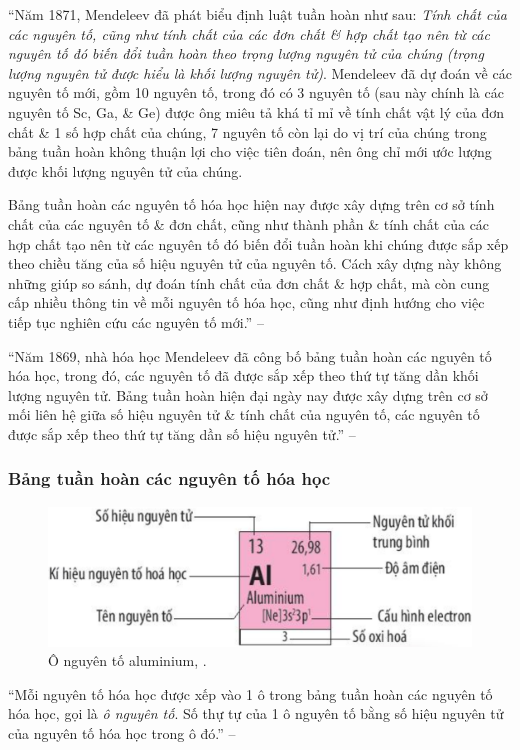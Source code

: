 \documentclass{article}
\numberwithin{equation}{section}
\begin{document}
``Năm 1871, Mendeleev đã phát biểu định luật tuần hoàn như sau: \textit{Tính chất của các nguyên tố, cũng như tính chất của các đơn chất \& hợp chất tạo nên từ các nguyên tố đó biến đổi tuần hoàn theo trọng lượng nguyên tử của chúng (trọng lượng nguyên tử được hiểu là khối lượng nguyên tử)}. Mendeleev đã dự đoán về các nguyên tố mới, gồm 10 nguyên tố, trong đó có 3 nguyên tố (sau này chính là các nguyên tố Sc, Ga, \& Ge) được ông miêu tả khá tỉ mỉ về tính chất vật lý của đơn chất \& 1 số hợp chất của chúng, 7 nguyên tố còn lại do vị trí của chúng trong bảng tuần hoàn không thuận lợi cho việc tiên đoán, nên ông chỉ mới ước lượng được khối lượng nguyên tử của chúng.

Bảng tuần hoàn các nguyên tố hóa học hiện nay được xây dựng trên cơ sở tính chất của các nguyên tố \& đơn chất, cũng như thành phần \& tính chất của các hợp chất tạo nên từ các nguyên tố đó biến đổi tuần hoàn khi chúng được sắp xếp theo chiều tăng của số hiệu nguyên tử của nguyên tố. Cách xây dựng này không những giúp so sánh, dự đoán tính chất của đơn chất \& hợp chất, mà còn cung cấp nhiều thông tin về mỗi nguyên tố hóa học, cũng như định hướng cho việc tiếp tục nghiên cứu các nguyên tố mới.'' -- \cite[p. 36]{SGK_Hoa_Hoc_10_Chan_Troi_Sang_Tao}

``Năm 1869, nhà hóa học Mendeleev đã công bố bảng tuần hoàn các nguyên tố hóa học, trong đó, các nguyên tố đã được sắp xếp theo thứ tự tăng dần khối lượng nguyên tử. Bảng tuần hoàn hiện đại ngày nay được xây dựng trên cơ sở mối liên hệ giữa số hiệu nguyên tử \& tính chất của nguyên tố, các nguyên tố được sắp xếp theo thứ tự tăng dần số hiệu nguyên tử.'' -- \cite[p. 38]{SGK_Hoa_Hoc_10_Chan_Troi_Sang_Tao}

\subsubsection{Bảng tuần hoàn các nguyên tố hóa học}

\begin{figure}[h]
	\centering
	\includegraphics[scale=0.15]{o_nguyen_to_aluminium}
	\caption{Ô nguyên tố aluminium, \cite[p. 38]{SGK_Hoa_Hoc_10_Chan_Troi_Sang_Tao}.}
\end{figure}
``Mỗi nguyên tố hóa học được xếp vào 1 ô trong bảng tuần hoàn các nguyên tố hóa học, gọi là \textit{ô nguyên tố}. Số thự tự của 1 ô nguyên tố bằng số hiệu nguyên tử của nguyên tố hóa học trong ô đó.'' -- \cite[p. 38]{SGK_Hoa_Hoc_10_Chan_Troi_Sang_Tao}
\end{document}
